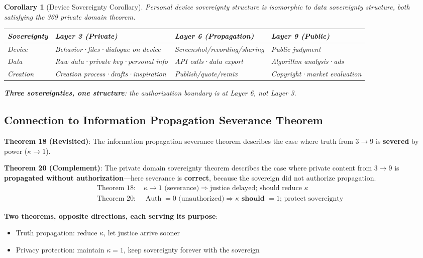 \documentclass[conference]{IEEEtran}
\newtheorem{corollary}[theorem]{Corollary}
\theoremstyle{remark}
\newcommand{\Auth}{\operatorname{Auth}}
\begin{document}
\begin{corollary}[Device Sovereignty Corollary]
Personal device sovereignty structure is isomorphic to data sovereignty structure, both satisfying the 369 private domain theorem.

\vspace{4pt}
\begin{tabular}{p{2.2cm}p{3cm}p{2.5cm}p{2cm}}
\toprule
Sovereignty & Layer 3 (Private) & Layer 6 (Propagation) & Layer 9 (Public) \\
\midrule
Device & Behavior·files·dialogue on device & Screenshot/recording/sharing & Public judgment \\
Data & Raw data·private key·personal info & API calls·data export & Algorithm analysis·ads \\
Creation & Creation process·drafts·inspiration & Publish/quote/remix & Copyright·market evaluation \\
\bottomrule
\end{tabular}

\textbf{Three sovereignties, one structure}: the authorization boundary is at Layer 6, not Layer 3.
\end{corollary}

\subsection{Connection to Information Propagation Severance Theorem}

\textbf{Theorem 18 (Revisited)}: The information propagation severance theorem describes the case where truth from 3$\to$9 is \textbf{severed} by power ($\kappa\to 1$).

\textbf{Theorem 20 (Complement)}: The private domain sovereignty theorem describes the case where private content from 3$\to$9 is \textbf{propagated without authorization}---here severance is \textbf{correct}, because the sovereign did not authorize propagation.
\begin{align*}
\text{Theorem 18: }& \kappa\to 1 \text{ (severance)} \Rightarrow \text{justice delayed; should reduce } \kappa\\
\text{Theorem 20: }& \Auth = 0 \text{ (unauthorized)} \Rightarrow \kappa \textbf{ should } = 1 \text{; protect sovereignty}
\end{align*}

\textbf{Two theorems, opposite directions, each serving its purpose}:
\begin{itemize}[nosep]
\item Truth propagation: reduce $\kappa$, let justice arrive sooner
\item Privacy protection: maintain $\kappa=1$, keep sovereignty forever with the sovereign
\end{itemize}
\end{document}
